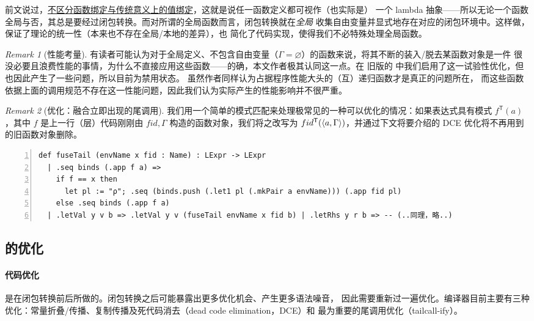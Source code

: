 \documentclass[a4paper, 11pt]{article}
\theoremstyle{remark}\newtheorem*{remark}{Remark}
\theoremstyle{definition}\newtheorem*{definition}{Definition}
\begin{document}
前文说过，\underline{\Tigris 不区分函数绑定与传统意义上的值绑定}，这就是说任一函数定义都可视作（也实际是）
一个 lambda 抽象——所以无论一个函数全局与否，其总是要经过闭包转换。而对所谓的全局函数而言，闭包转换就在\emph{全局}
收集自由变量并显式地存在对应的闭包环境中。这样做，保证了理论的统一性（\lambdacalc 本来也不存在全局/本地的差异），也
简化了代码实现，使得我们不必特殊处理全局函数。

\begin{remark}[性能考量]
  有读者可能认为对于全局定义、不包含自由变量（$\Gamma=\varnothing$）的函数来说，将其不断的装入/脱去某函数对象是一件
  很没必要且浪费性能的事情，为什么不直接应用这些函数——的确，本文作者极其认同这一点。在
  旧版的 \Tigris 中我们启用了这一试验性优化，但也因此产生了一些问题，所以目前为禁用状态。
  虽然作者同样认为占据程序性能大头的（互）递归函数才是真正的问题所在，
  而这些函数依据上面的调用规范不存在这一性能问题，因此我们认为实际产生的性能影响并不很严重。
\end{remark}

\begin{remark}[优化：融合立即出现的尾调用]
  我们用一个简单的模式匹配来处理极常见的一种可以优化的情况：如果表达式具有模式 $f^\mathsf{T}(a)$，其中 $f$ 是上一行（层）代码刚刚由 $fid, \Gamma$ 构造的函数对象，我们将之改写为
  $fid^\mathsf{T}(\langle a, \Gamma \rangle)$，并通过下文将要介绍的 DCE 优化将不再用到的旧函数对象删除。
\begin{Verbatim}[numbers=left]
def fuseTail (envName x fid : Name) : LExpr -> LExpr
  | .seq binds (.app f a) =>
    if f == x then
      let pl := "ρ"; .seq (binds.push (.let1 pl (.mkPair a envName))) (.app fid pl)
    else .seq binds (.app f a)
  | .letVal y v b => .letVal y v (fuseTail envName x fid b) | .letRhs y r b => -- (..同理，略..)
\end{Verbatim}
\end{remark}

\subsection{\Lambdair 的优化}

\paragraph{代码优化} 是在闭包转换前后所做的。闭包转换之后可能暴露出更多优化机会、产生更多语法噪音，
因此需要重新过一遍优化。\Tigris 编译器目前主要有三种优化：常量折叠/传播、复制传播及死代码消去（dead code elimination，DCE）和
最为重要的尾调用优化（tailcall-ify）。
\end{document}
